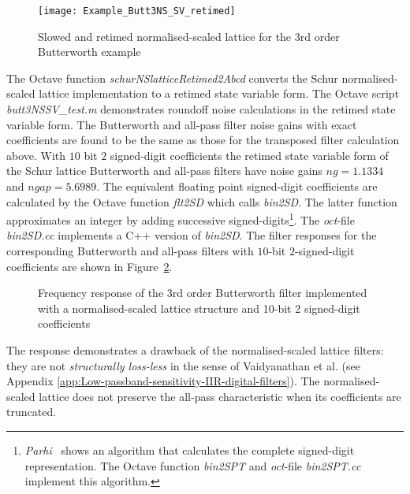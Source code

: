 \documentclass[a4paper,twoside,10pt,english]{report}
\begin{document}
\begin{figure}[!hbt]
\begin{center}
\texttt{[image: Example\_Butt3NS\_SV\_retimed]}
\caption{Slowed and retimed normalised-scaled lattice for the 3rd order 
Butterworth example}
\label{fig:Slowed-and-retimed-3rdButt-Norm}
\end{center}
\end{figure}

The Octave function \emph{schurNSlatticeRetimed2Abcd} converts the Schur
normalised-scaled lattice implementation to a retimed state variable form. The 
Octave script \emph{butt3NSSV\_test.m} demonstrates roundoff noise
calculations in the retimed state variable form. The Butterworth and all-pass
filter noise gains with exact coefficients are found to be the same as those
for the transposed filter calculation above. With $10$ bit $2$ signed-digit
coefficients the retimed state variable form of the Schur lattice Butterworth
and all-pass filters have noise gains $ng=1.1334$ and $ngap=5.6989$. The
equivalent floating point signed-digit coefficients are calculated by the
Octave function \emph{flt2SD} which calls \emph{bin2SD}. The latter function
approximates an integer by adding successive signed-digits\footnote{
\emph{Parhi}~\cite[Section 13.6.1, p.507]{Parhi_VLSIDigitalSignalProcessingSystems}
shows an algorithm that calculates the complete signed-digit representation.
The Octave function \emph{bin2SPT} and \emph{oct}-file \emph{bin2SPT.cc}
implement this algorithm.}. The \emph{oct}-file \emph{bin2SD.cc} implements a 
C++ version of \emph{bin2SD}. The filter responses for the corresponding 
Butterworth and all-pass filters with $10$-bit $2$-signed-digit coefficients 
are shown in Figure~\ref{fig:Freq-response-butt3NSSV}.
\begin{figure}[!htbp]
\begin{center}
\scalebox{0.7}{}
\caption{Frequency response of the 3rd order Butterworth filter implemented with a normalised-scaled lattice structure and 10-bit 2 signed-digit coefficients}
\label{fig:Freq-response-butt3NSSV}
\end{center}
\end{figure}
The response demonstrates a drawback of the normalised-scaled lattice filters:
they are not \emph{structurally loss-less} in the sense of Vaidyanathan et al.
\cite{VaidyanathanMitraNuevo_LowSensitivityIIRDigitalFilters, 
VaidyanathanMitra_LowPassbandSensitivityDigitalFilters} (see Appendix
\ref{app:Low-passband-sensitivity-IIR-digital-filters}). The normalised-scaled
lattice does not preserve the all-pass characteristic when its coefficients
are truncated.
\clearpage
\end{document}
